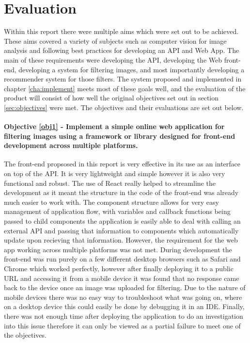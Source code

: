 \documentclass[a4paper,12pt]{report}
\begin{document}
\chapter{Evaluation}
  Within this report there were multiple aims which were set out to be achieved. These aims covered a variety of subjects such as computer vision for image analysis and following best practices for developing an API and Web App. The main of these requirements were developing the API, developing the Web front-end, developing a system for filtering images, and most importantly developing a recommender system for those filters. The system proposed and implemented in chapter \ref{cha:implement} meets most of these goals well, and the evaluation of the product will consist of how well the original objectives set out in section \ref{sec:objectives} were met. The objectives and their evaluations are set out below.

  \newpage
  \subsubsection{Objective \ref{obj1} - Implement a simple online web application for filtering images using a framework or library designed for front-end development across multiple platforms.}
    The front-end propsosed in this report is very effective in its use as an interface on top of the API. It is very lightweight and simple however it is also very functional and robust. The use of React really helped to streamline the development as it meant the structure in the code of the front-end was already much easier to work with. The component structure allows for very easy management of application flow, with variables and callback functions being passed to child components the application is easily able to deal with calling an external API and passing that information to components which automatically update upon recieving that information. However, the requirement for the web app working across multiple platforms was not met. During development the front-end was run purely on a few different desktop browsers such as Safari and Chrome which worked perfectly, however after finally deploying it to a public URL and accessing it from a mobile device it was found that no response came back to the device once an image was uploaded for filtering. Due to the nature of mobile devices there was no easy way to troubleshoot what was going on, where on a desktop device this could easily be done by debugging it in an IDE. Finally, there was not enough time after deploying the application to do an investigation into this issue therefore it can only be viewed as a partial failure to meet one of the objectives.
\end{document}
